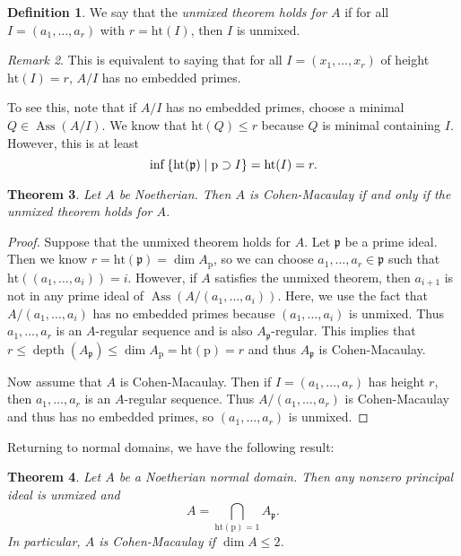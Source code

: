 \documentclass[leqno, openany]{memoir}
\newtheorem{thm}{Theorem}[section]
\theoremstyle{definition}
\newtheorem{defn}[thm]{Definition}
\theoremstyle{remark}
\newtheorem{rmk}[thm]{Remark}
\theoremstyle{plain}
\theoremstyle{definition}
\theoremstyle{remark}
\newcommand{\mf}[1]{\mathfrak{#1}}
\newcommand{\mr}[1]{\mathrm{#1}}
\DeclareMathOperator{\Ass}{Ass}
\DeclareMathOperator{\dpth}{depth}
\begin{document}
\begin{defn} We say that the \textit{unmixed theorem holds for $A$} if for all
$I = (a_1, \ldots, a_r)$ with $r = \mr{ht}(I)$, then $I$ is unmixed.
\end{defn}

\begin{rmk} This is equivalent to saying that for all $I = (x_1, \ldots, x_r)$
    of height $\mr{ht}(I) = r$, $A/I$ has no embedded primes.

    To see this, note that if $A/I$ has no embedded primes, choose a minimal $Q
    \in \Ass(A/I)$. We know that $\mr{ht}(Q) \leq r$ because $Q$ is minimal
    containing $I$. However, this is at least \[ \inf \qty{ \mr{ht}(\mf{p})
    \mid \mr{p} \supset I } = \mr{ht}(I) = r. \] \end{rmk}

\begin{thm} Let $A$ be Noetherian. Then $A$ is Cohen-Macaulay if and only if
the unmixed theorem holds for $A$.  \end{thm}

\begin{proof} Suppose that the unmixed theorem holds for $A$. Let $\mf{p}$ be a
    prime ideal. Then we know $r = \mr{ht}(\mf{p}) = \dim A_{\mr{p}}$, so we
    can choose $a_1, \ldots, a_r \in \mf{p}$ such that $\mr{ht}((a_1, \ldots,
    a_i)) = i$. However, if $A$ satisfies the unmixed theorem, then $a_{i+1}$
    is not in any prime ideal of $\Ass(A/(a_1, \ldots, a_i))$. Here, we use the
    fact that $A/(a_1, \ldots, a_i)$ has no embedded primes because $(a_1,
    \ldots, a_i)$ is unmixed. Thus $a_1, \ldots, a_r$ is an $A$-regular
    sequence and is also $A_{\mf{p}}$-regular. This implies that $r \leq
    \dpth(A_{\mf{p}}) \leq \dim A_{\mr{p}} = \mr{ht}(\mr{p}) = r$ and thus
    $A_{\mf{p}}$ is Cohen-Macaulay.

    Now assume that $A$ is Cohen-Macaulay. Then if $I = (a_1, \ldots, a_r)$ has
height $r$, then $a_1, \ldots, a_r$ is an $A$-regular sequence. Thus $A/(a_1,
\ldots, a_r)$ is Cohen-Macaulay and thus has no embedded primes, so $(a_1,
\ldots, a_r)$ is unmixed.  \end{proof}

Returning to normal domains, we have the following result: \begin{thm} Let $A$
    be a Noetherian normal domain. Then any nonzero principal ideal is unmixed
    and \[ A = \bigcap_{\mr{ht}(\mr{p}) = 1} A_{\mf{p}}. \] In particular, $A$
    is Cohen-Macaulay if $\dim A \leq 2$.  \end{thm}
\end{document}
